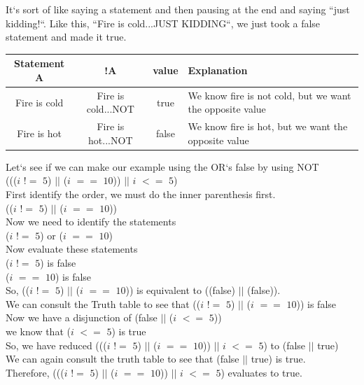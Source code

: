 \documentclass[11]{article}
\begin{document}
It`s sort of like saying a statement and then pausing at the end and saying ``just kidding!``. Like this, ``Fire is cold...JUST KIDDING``, we just took a false statement and made it true.

\begin{center}
  \begin{tabular}{ | c | c | c | p{4.5cm} |}
    \hline
		Statement A  & !A & value & Explanation \\ \hline
		Fire is cold & Fire is cold...NOT & true & We know fire is not cold, but we want the opposite value\\  \hline
		
		Fire is hot & Fire is hot...NOT & false & We know fire is hot, but we want the opposite value\\ \hline		
  \end{tabular}
\end{center}

Let`s see if we can make our example using the OR`s false by using NOT\\
((($i$ $!=$ $5$) $||$ ($i$ $==$ $10$)) $||$ $i$ $<=$ $5$)\\

First identify the order, we must do the inner parenthesis first.\\
(($i$ $!=$ $5$) $||$ ($i$ $==$ $10$))\\
Now we need to identify the statements\\
($i$ $!=$ $5$) or ($i$ $==$ $10$) \\
Now evaluate these statements \\
($i$ $!=$ $5$) is false\\
 ($i$ $==$ $10$) is false \\
 So, (($i$ $!=$ $5$) $||$ ($i$ $==$ $10$)) is equivalent to ((false) $||$ (false)).\\
 We can consult the Truth table to see that (($i$ $!=$ $5$) $||$ ($i$ $==$ $10$)) is false\\
 
 Now we have a disjunction of (false $||$ ($i$ $<=$ $5$))\\
 we know that ($i$ $<=$ $5$) is true \\
 So, we have reduced ((($i$ $!=$ $5$) $||$ ($i$ $==$ $10$)) $||$ $i$ $<=$ $5$) to (false $||$ true)\\
 We can again consult the truth table to see that (false $||$ true) is true.\\
 
 Therefore, ((($i$ $!=$ $5$) $||$ ($i$ $==$ $10$)) $||$ $i$ $<=$ $5$) evaluates to true.\\
 
\end{document}
